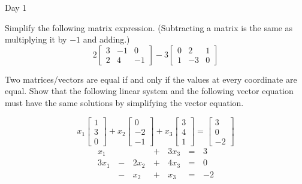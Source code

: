 \begin{applicationActivities}{Day 1}
\begin{activity}
  Simplify the following matrix expression. (Subtracting a matrix is the
  same as multiplying it by \(-1\) and adding.)
  \[
  2
  \begin{bmatrix}
    3 & -1 & 0 \\
    2 & 4  & -1
  \end{bmatrix}-
  3
  \begin{bmatrix}
    0 & 2 & 1 \\
    1 & -3  & 0
  \end{bmatrix}
  \]
\end{activity}


\begin{activity}
  Two matrices/vectors are equal if and only if the values at every coordinate
  are equal. Show that the following linear system and the following vector
  equation must have the same solutions by simplifying the vector equation.
  \begin{multicols}{2}\noindent
  \[
    x_1
    \begin{bmatrix}
      1 \\
      3 \\
      0
    \end{bmatrix}+
    x_2
    \begin{bmatrix}
      0 \\
      -2 \\
      -1
    \end{bmatrix}+
    x_3
    \begin{bmatrix}
      3 \\
      4 \\
      1
    \end{bmatrix}=
    \begin{bmatrix}
      3 \\
      0 \\
      -2
    \end{bmatrix}
  \]
  \begin{alignat*}{4}
     x_1 &     &      &\,+\,& 3x_3 &\,=\,& 3 \\
    3x_1 &\,-\,& 2x_2 &\,+\,& 4x_3 &\,=\,& 0 \\
         &\,-\,&  x_2 &\,+\,&  x_3 &\,=\,& -2
  \end{alignat*}
  \end{multicols}
\end{activity}


\end{applicationActivities}

